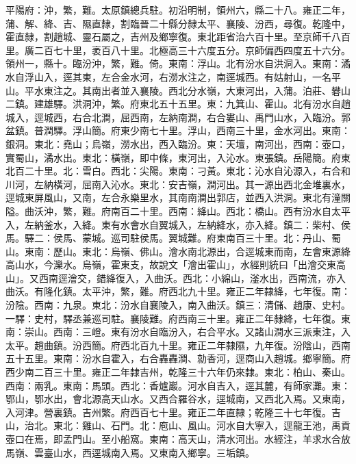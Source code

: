\begin{pinyinscope}
平陽府：沖，繁，難。太原鎮總兵駐。初沿明制，領州六，縣二十八。雍正二年，蒲、解、絳、吉、隰直隸，割臨晉二十縣分隸太平、襄陵、汾西，尋復。乾隆中，霍直隸，割趙城、靈石屬之，吉州及鄉寧復。東北距省治六百十里。至京師千八百里。廣二百七十里，袤百八十里。北極高三十六度五分。京師偏西四度五十六分。領州一，縣十。臨汾沖，繁，難。倚。東南：浮山。北有汾水自洪洞入。東南：潏水自浮山入，逕其東，左合金水河，右澇水注之，南逕城西。有姑射山，一名平山。平水東注之。其南出者並入襄陵。西北分水嶺，大東河出，入蒲。泊莊、礬山二鎮。建雄驛。洪洞沖，繁。府東北五十五里。東：九箕山、霍山。北有汾水自趙城入，逕城西，右合北澗，屈西南，左納南澗，右合婁山、禹門山水，入臨汾。郭盆鎮。普潤驛。浮山簡。府東少南七十里。浮山，西南三十里，金水河出。東南：銀洞。東北：堯山；烏嶺，澇水出，西入臨汾。東：天壇，南河出，西南：壺口，實蜀山，潏水出。東北：橫嶺，即中條，東河出，入沁水。東張鎮。岳陽簡。府東北百二十里。北：雪白。西北：尖陽。東南：刁黃。東北：沁水自沁源入，右合和川河，左納橫河，屈南入沁水。東北：安吉嶺，澗河出。其一源出西北金堆裏水，逕城東屏風山，又南，左合永樂里水，其南南澗出郭店，並西入洪洞。東北有潼關隘。曲沃沖，繁，難。府南百二十里。西南：絳山。西北：橋山。西有汾水自太平入，左納釜水，入絳。東有水會水自翼城入，左納絳水，亦入絳。鎮二：柴村、侯馬。驛二：侯馬、蒙城。巡司駐侯馬。翼城難。府東南百三十里。北：丹山、蜀山。東南：歷山。東北：烏嶺、佛山。澮水南北源出，合逕城東而南，左會東源絳高山水，今灤水。烏嶺，霍東支，故說文「澮出霍山」，水經則統曰「出澮交東高山」。又西南逕澮交，錯絳復入，入曲沃。西北：小綿山，滏水出，西南流，亦入曲沃。有隆化鎮。太平沖，繁，難。府西北九十里。雍正二年隸絳，七年復。南：汾陰。西南：九泉。東北：汾水自襄陵入，南入曲沃。鎮三：清儲、趙康、史村。一驛：史村，驛丞兼巡司駐。襄陵難。府西南三十里。雍正二年隸絳，七年復。東南：崇山。西南：三嶝。東有汾水自臨汾入，右合平水。又諸山澗水三派東注，入太平。趙曲鎮。汾西簡。府西北百九十里。雍正二年隸隰，九年復。汾陰山，西南五十五里。東南：汾水自霍入，右合轟轟澗、勍香河，逕商山入趙城。鄉寧簡。府西少南二百三十里。雍正二年隸吉州，乾隆三十六年仍來隸。東北：柏山、秦山。西南：兩乳。東南：馬頭。西北：香爐巖。河水自吉入，逕其麓，有師家灘。東：鄂山，鄂水出，會北源高天山水。又西合羅谷水，逕城南，又西北入焉。又東南，入河津。營裏鎮。吉州繁。府西百七十里。雍正二年直隸；乾隆三十七年復。吉山，治北。東北：雞山、石門。北：庖山、風山。河水自大寧入，逕龍王池，禹貢壺口在焉，即孟門山。至小船窩。東南：高天山，清水河出。水經注，羊求水合放馬嶺、雲臺山水，西逕城南入焉。又東南入鄉寧。三垢鎮。


\end{pinyinscope}
